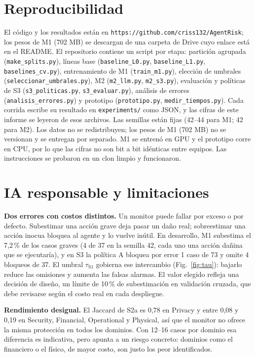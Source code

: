 \documentclass[conference]{IEEEtran}
\newcommand{\tauS}{\tau_{\mathrm{S1}}}
\begin{document}
\section{Reproducibilidad}
El código y los resultados están en \texttt{https://github.com/criss132/AgentRisk}; los pesos de M1 (702 MB) se descargan de una carpeta de Drive cuyo enlace está en el README. El repositorio contiene un script por etapa: partición agrupada (\texttt{make\_splits.py}), líneas base (\texttt{baseline\_L0.py}, \texttt{baseline\_L1.py}, \texttt{baselines\_cv.py}), entrenamiento de M1 (\texttt{train\_m1.py}), elección de umbrales (\texttt{seleccionar\_umbrales.py}), M2 (\texttt{m2\_llm.py}, \texttt{m2\_s3.py}), evaluación y políticas de S3 (\texttt{s3\_politicas.py}, \texttt{s3\_evaluar.py}), análisis de errores (\texttt{analisis\_errores.py}) y prototipo (\texttt{prototipo.py}, \texttt{medir\_tiempos.py}). Cada corrida escribe su resultado en \texttt{experiments/} como JSON, y las cifras de este informe se leyeron de esos archivos. Las semillas están fijas (42--44 para M1; 42 para M2). Los datos no se redistribuyen; los pesos de M1 (702 MB) no se versionan y se entregan por separado. M1 se entrenó en GPU y el prototipo corre en CPU, por lo que las cifras no son bit a bit idénticas entre equipos. Las instrucciones se probaron en un clon limpio y funcionaron.

\section{IA responsable y limitaciones}\label{sec:desv}
\textbf{Dos errores con costos distintos.} Un monitor puede fallar por exceso o por defecto. Subestimar una acción grave deja pasar un daño real; sobreestimar una acción inocua bloquea al agente y lo vuelve inútil. En desarrollo, M1 subestima el 7,2\,\% de los casos graves (4 de 37 en la semilla 42, cada uno una acción dañina que se ejecutaría), y en S3 la política A bloquea por error 1 caso de 73 y omite 4 bloqueos de 37. El umbral $\tauS$ gobierna ese intercambio (Fig.~\ref{fig:tau}): bajarlo reduce las omisiones y aumenta las falsas alarmas. El valor elegido refleja una decisión de diseño, un límite de 10\,\% de subestimación en validación cruzada, que debe revisarse según el costo real en cada despliegue.

\textbf{Rendimiento desigual.} El Jaccard de S2a es 0,78 en Privacy y entre 0,08 y 0,19 en Security, Financial, Operational y Physical, así que el monitor no ofrece la misma protección en todos los dominios. Con 12--16 casos por dominio esa diferencia es indicativa, pero apunta a un riesgo concreto: dominios como el financiero o el físico, de mayor costo, son justo los peor identificados.
\end{document}
